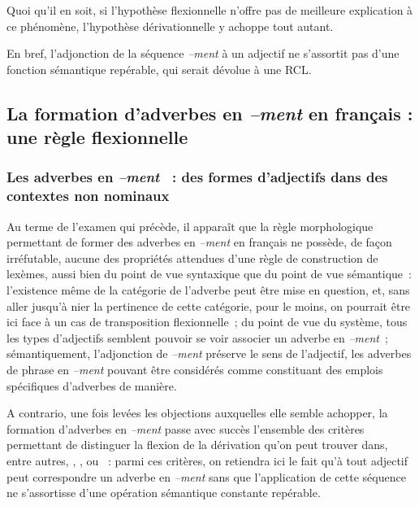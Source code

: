 \documentclass[output=paper]{langsci/langscibook}
\begin{document}
Quoi qu'il en soit, si l'hypothèse flexionnelle n'offre pas de meilleure explication à ce phénomène, l'hypothèse dérivationnelle y achoppe tout autant.

En bref, l'adjonction de la séquence \emph{--ment} à un adjectif ne s'assortit pas d'une fonction sémantique repérable, qui serait dévolue à une RCL.

\subsection{La formation d'adverbes en \emph{--ment} en français : une règle flexionnelle}\label{section:dal:3.4}

\subsubsection{Les adverbes en \emph{--ment} ~: des formes d'adjectifs dans des contextes non nominaux}\label{section:dal:3.4.1}

Au terme de l'examen qui précède, il apparaît que la règle morphologique permettant de former des adverbes en \emph{--ment} en français ne possède, de façon irréfutable, aucune des propriétés attendues d'une règle de construction de lexèmes, aussi bien du point de vue syntaxique que du point de vue sémantique~: l'existence même de la catégorie de l'adverbe peut être mise en question, et, sans aller jusqu'à nier la pertinence de cette catégorie, pour le moins, on pourrait être ici face à un cas de transposition flexionnelle~; du point de vue du système, tous les types d'adjectifs semblent pouvoir se voir associer un adverbe en \emph{--ment}~; sémantiquement, l'adjonction de \emph{--ment} préserve le sens de l'adjectif, les adverbes de phrase en \emph{--ment} pouvant être considérés comme constituant des emplois spécifiques d'adverbes de manière.

A contrario, une fois levées les objections auxquelles elle semble achopper, la formation d'adverbes en \emph{--ment} passe avec succès l'ensemble des critères permettant de distinguer la flexion de la dérivation qu'on peut trouver dans, entre autres, %
\citet{Bauer1997}%
%
, %
\citet{Dressler05}%
%
, %
\citet{Stump05} %
%
ou %
\citet{Stekauer2005a}%
%
~: parmi ces critères, on retiendra ici le fait qu'à tout adjectif peut correspondre un adverbe en \emph{--ment} sans que l'application de cette séquence ne s'assortisse d'une opération sémantique constante repérable.
\end{document}
